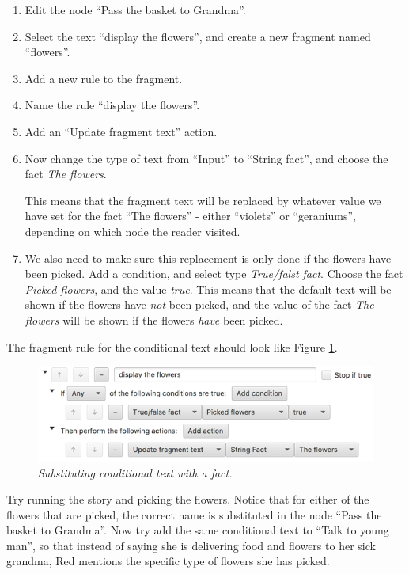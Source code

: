 \documentclass{article}
\begin{document}
\begin{enumerate}
  \item Edit the node ``Pass the basket to Grandma''.
  \item Select the text ``display the flowers'', and create a new fragment named ``flowers''.
  \item Add a new rule to the fragment.
  \item Name the rule ``display the flowers''.
  \item Add an ``Update fragment text'' action.
  \item Now change the type of text from ``Input'' to ``String
  fact'', and choose the fact \textit{The flowers}.

This means that the fragment text will be replaced by whatever value we have set for the fact ``The flowers'' - either ``violets'' or ``geraniums'', depending on which node the reader visited. 

\item We also need to make sure this replacement is only done if the flowers have been picked. Add a condition, and select type \textit{True/falst fact}. Choose the fact \textit{Picked flowers}, and the value \textit{true}. This means that the default text will be shown if the flowers have \textit{not} been picked, and the value of the fact \textit{The flowers} will be shown if the flowers \textit{have} been picked.
\end{enumerate}

The fragment rule for the conditional text should look like Figure \ref{fig:tut3:conditional_text}.

\begin{figure}[h]
  \centering
  \includegraphics[width=12cm]{images/hypedyn-tutorial-3-figure-12}
  \caption{\textit{Substituting conditional text with a fact.}}
  \label{fig:tut3:conditional_text}
\end{figure}

Try running the story and picking the flowers. Notice that for either of the flowers that are picked, the correct name is substituted in the node ``Pass the basket to Grandma''. Now try add the same conditional text to ``Talk to young man'', so that instead of saying she is delivering food and flowers to her sick grandma, Red mentions the specific type of flowers she has picked.
\end{document}
